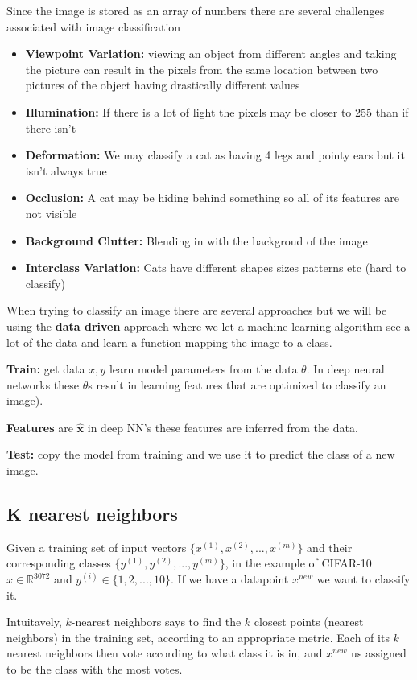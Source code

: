 \documentclass[twocolumn, letter, 10pt, landscape]{article}
\newcommand{\mb}{\mathbf}
\newcommand{\tb}{\textbf}
\newcommand{\bit}{\vspace{-0.1in}\begin{itemize}\setlength\itemsep{-0.05in}}
\newcommand{\eit}{\end{itemize}\vspace{-0.1in}}
\begin{document}
Since the image is stored as an array of numbers there are several challenges associated with image classification
\bit
\item \tb{Viewpoint Variation:} viewing an object from different angles and taking the picture can result in the pixels from the same location between two pictures of the object having drastically different values
\item \tb{Illumination:} If there is a lot of light the pixels may be closer to $255$ than if there isn't
\item \tb{Deformation:} We may classify a cat as having 4 legs and pointy ears but it isn't always true
\item \tb{Occlusion:} A cat may be hiding behind something so all of its features are not visible
\item \tb{Background Clutter:} Blending in with the backgroud of the image
\item \tb{Interclass Variation:} Cats have different shapes sizes patterns etc (hard to classify)
\eit

When trying to classify an image there are several approaches but we will be using the \tb{data driven} approach where we let a machine learning algorithm see a lot of the data and learn a function mapping the image to a class.

\tb{Train:} get data $x, y$ learn model parameters from the data $\theta$. In deep neural networks these $\theta$s result in learning features that are optimized to classify an image).

\tb{Features} are $\hat{\mb{x}}$ in deep NN's these features are inferred from the data.

\tb{Test:} copy the model from training and we use it to predict the class of a new image.

\subsection{K nearest neighbors}

Given a training set of input vectors $\{x^{(1)},x^{(2)},...,x^{(m)}\}$ and their corresponding classes $\{y^{(1)}, y^{(2)},...,y^{(m)}\}$, in the example of CIFAR-10 $x\in \mathbb{R}^{3072}$ and $y^{(i)}\in \{1,2,...,10\}$. If we have a datapoint $x^{new}$ we want to classify it.

Intuitavely, $k$-nearest neighbors says to find the $k$ closest points (nearest neighbors) in the training set, according to an appropriate metric. Each of its $k$ nearest neighbors then vote according to what class it is in, and $x^{new}$ us assigned to be the class with the most votes.
\end{document}
